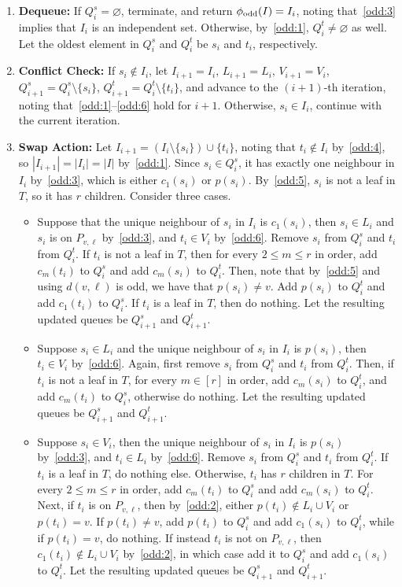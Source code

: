 \documentclass[11pt]{article}
\theoremstyle{definition}
\begin{document}
\begin{enumerate}
    \item \textbf{Dequeue:} If $Q_i^s=\varnothing$, terminate, and return $\phi_{\textup{odd}}(I)=I_i$, noting that~\ref{odd:3} implies that $I_i$ is an independent set. Otherwise, by~\ref{odd:1}, $Q_i^t\not=\varnothing$ as well. Let the oldest element in $Q_i^s$ and $Q_i^t$ be $s_i$ and $t_i$, respectively. 
    \item \textbf{Conflict Check:} If $s_i\notin I_i$, let $I_{i+1}=I_i$, $L_{i+1}=L_i$, $V_{i+1}=V_i$, $Q_{i+1}^s=Q_i^s\setminus\{s_i\}$, $Q_{i+1}^t=Q_i^t\setminus\{t_i\}$, and advance to the $(i+1)$-th iteration, noting that~\ref{odd:1}--\ref{odd:6} hold for $i+1$. Otherwise, $s_i\in I_i$, continue with the current iteration.
    \item \textbf{Swap Action:} Let $I_{i+1}=(I_i\setminus \{s_i\}) \cup \{t_i\}$, noting that $t_i\not\in I_i$ by~\ref{odd:4}, so $|I_{i+1}|=|I_i|=|I|$ by~\ref{odd:1}. Since $s_i\in Q_i^s$, it has exactly one neighbour in $I_i$ by~\ref{odd:3}, which is either $c_1(s_i)$ or $p(s_i)$. By~\ref{odd:5}, $s_i$ is not a leaf in $T$, so it has $r$ children. Consider three cases.
    \begin{itemize}
        \item Suppose that the unique neighbour of $s_i$ in $I_i$ is $c_1(s_i)$, then $s_i\in L_i$ and $s_i$ is on $P_{v,\ell}$ by~\ref{odd:3}, and $t_i\in V_i$ by~\ref{odd:6}. Remove $s_i$ from $Q_i^s$ and $t_i$ from $Q_i^t$. If $t_i$ is not a leaf in $T$, then for every $2\leq m\leq r$ in order, add $c_m(t_i)$ to $Q_i^s$ and add $c_m(s_i)$ to $Q_i^t$. Then, note that by~\ref{odd:5} and using $d(v,\ell)$ is odd, we have that $p(s_i) \not= v$. Add $p(s_i)$ to $Q_i^t$ and add $c_1(t_i)$ to $Q_i^s$. If $t_i$ is a leaf in $T$, then do nothing. Let the resulting updated queues be $Q_{i+1}^s$ and $Q_{i+1}^t$.
        \item Suppose $s_i\in L_i$ and the unique neighbour of $s_i$ in $I_i$ is $p(s_i)$, then $t_i\in V_i$ by~\ref{odd:6}. Again, first remove $s_i$ from $Q_i^s$ and $t_i$ from $Q_i^t$. Then, if $t_i$ is not a leaf in $T$, for every $m\in[r]$ in order, add $c_m(s_i)$ to $Q_i^t$, and add $c_m(t_i)$ to $Q_i^s$, otherwise do nothing. Let the resulting updated queues be $Q_{i+1}^s$ and $Q_{i+1}^t$. 
        \item Suppose $s_i\in V_i$, then the unique neighbour of $s_i$ in $I_i$ is $p(s_i)$ by~\ref{odd:3}, and $t_i\in L_i$ by~\ref{odd:6}. Remove $s_i$ from $Q_i^s$ and $t_i$ from $Q_i^t$. If $t_i$ is a leaf in $T$, do nothing else. Otherwise, $t_i$ has $r$ children in $T$. For every $2\leq m\leq r$ in order, add $c_m(t_i)$ to $Q_i^s$ and add $c_m(s_i)$ to $Q_i^t$. Next, if $t_i$ is on $P_{v,\ell}$, then by~\ref{odd:2}, either $p(t_i)\not\in L_i\cup V_i$ or $p(t_i) = v$. If $p(t_i)\not=v$, add $p(t_i)$ to $Q_i^s$ and add $c_1(s_i)$ to $Q_i^t$, while if $p(t_i)=v$, do nothing. If instead $t_i$ is not on $P_{v,\ell}$, then $c_1(t_i)\not\in L_i\cup V_i$ by~\ref{odd:2}, in which case add it to $Q_i^s$ and add $c_1(s_i)$ to $Q_i^t$. Let the resulting updated queues be $Q_{i+1}^s$ and $Q_{i+1}^t$. 
    \end{itemize}
\end{enumerate}
\end{document}
